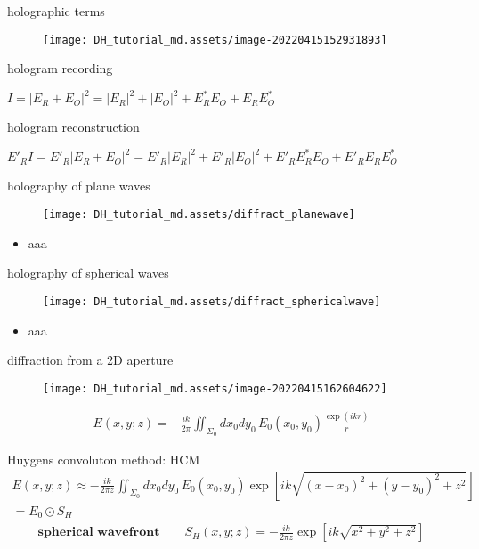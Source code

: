 \documentclass[t, aspectratio=169]{beamer}
\begin{document}
\begin{frame}{holographic terms}
	\begin{figure}
		\texttt{[image: DH\_tutorial\_md.assets/image-20220415152931893]}
	\end{figure}	
hologram recording \\
	\begin{center}
		$I = |E_R + E_O|^2 = |E_R|^2 + |E_O|^2 +E_R^*E_O + E_RE_O^*$
	\end{center}
	\pause
hologram reconstruction \\
	\begin{center}
		$E'_RI = E'_R|E_R+E_O|^2 
		=E'_R|E_R|^2 + E'_R|E_O|^2 + E'_RE_R^*E_O + E'_RE_RE_O^*$
	\end{center}
\end{frame}


\begin{frame}{holography of plane waves}
	\begin{figure}
		\texttt{[image: DH\_tutorial\_md.assets/diffract\_planewave]}
	\end{figure}
	\begin{itemize}
		\item aaa
	\end{itemize}
\end{frame}


\begin{frame}{holography of spherical waves}
	\begin{figure}
		\texttt{[image: DH\_tutorial\_md.assets/diffract\_sphericalwave]}
	\end{figure}
	\begin{itemize}
		\item aaa
	\end{itemize}
\end{frame}


\begin{frame}{diffraction from a 2D aperture}
	\begin{figure}
		\texttt{[image: DH\_tutorial\_md.assets/image-20220415162604622]}
	\end{figure}
	\begin{gather*}
E(x,y;z) = -\frac{ik}{2\pi}\iint_{\Sigma_0} dx_0dy_0\,E_0(x_0,y_0)\frac{\exp(ikr)}{r}
	\end{gather*}
\end{frame}


\begin{frame}{Huygens convoluton method: HCM}	
	\begin{gather*}	
E(x,y;z) \approx -\frac{ik}{2\pi z} \iint_{\Sigma_0} dx_0dy_0\,E_0(x_0,y_0)\exp\left[ik\sqrt{(x-x_0)^2 + (y-y_0)^2 + z^2 }\right] \\
= E_0 \odot S_H 
	\end{gather*}
	\pause
	\begin{gather*}
\textbf{spherical wavefront} \qquad S_H(x,y;z) = - \frac{ik}{2\pi z} \exp\left[ik\sqrt{x^2+y^2+z^2}\right]
	\end{gather*}
\end{frame}
\end{document}
